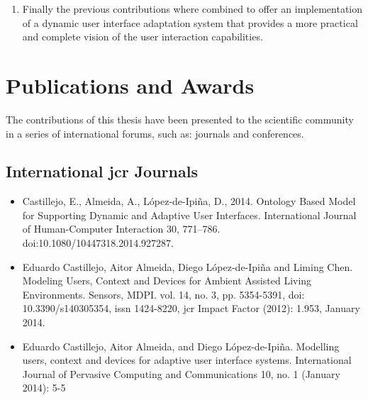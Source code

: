 \begin{enumerate}[label=\alph*)]

  \item Finally the previous contributions where combined to offer an 
  implementation of a dynamic user interface adaptation system that provides a 
  more practical and complete vision of the user interaction capabilities.
  
\end{enumerate}


\section{Publications and Awards}
\label{sec:publications}

The contributions of this thesis have been presented to the scientific community 
in a series of international forums, such as: journals and conferences.

\subsection{International \acs{jcr} Journals}


\begin{itemize}
  \item Castillejo, E., Almeida, A., {López-de-Ipiña}, D., 2014. Ontology Based 
  Model for Supporting Dynamic and Adaptive User Interfaces. International 
  Journal of Human-Computer Interaction 30, 771–786. 
  doi:10.1080/10447318.2014.927287.


  \item Eduardo Castillejo, Aitor Almeida, Diego {López-de-Ipiña} and Liming Chen. 
  Modeling Users, Context and Devices for Ambient Assisted Living 
  Environments. Sensors, MDPI. vol. 14, no. 3, pp. 5354-5391, \acs{doi}: 
  10.3390/s140305354, \acs{issn} 1424-8220, \acs{jcr} Impact Factor (2012): 1.953, 
  January 2014.
  
  \item Eduardo Castillejo, Aitor Almeida, and Diego {López-de-Ipiña}. Modelling 
  users, context and devices for adaptive user interface systems. International 
  Journal of Pervasive Computing and Communications 10, no. 1 (January 2014): 
  5-5
\end{itemize}
  
